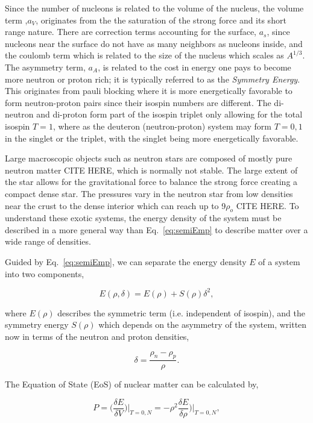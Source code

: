 Since the number of nucleons is related to the volume of the nucleus, the volume term ,$a_V$, originates from the the saturation of the strong force and its short range nature. There are correction terms accounting for the surface, $a_s$, since nucleons near the surface do not have as many neighbors as nucleons inside, and the coulomb term which is related to the size of the nucleus which scales as $A^{1/3}$. The asymmetry term, $a_A$, is related to the cost in energy one pays to become more neutron or proton rich; it is typically referred to as the \emph{Symmetry Energy}. This originates from pauli blocking where it is more energetically favorable to form neutron-proton pairs since their isospin numbers are different. The di-neutron and di-proton form part of the isospin triplet only allowing for the total isospin $T=1$, where as the deuteron (neutron-proton) system may form $T={0,1}$ in the singlet or the triplet, with the singlet being more energetically favorable. 

Large macroscopic objects such as neutron stars are composed of mostly pure neutron matter CITE HERE, which is normally not stable. The large extent of the star allows for the gravitational force to balance the strong force creating a compact dense star. The pressures vary in the neutron star from low densities near the crust to the dense interior which can reach up to 9$\rho_o$ CITE HERE. To understand these exotic systems, the energy density of the system must be described in a more general way than Eq.~\ref{eq:semiEmp} to describe matter over a wide range of densities. 

Guided by Eq.~\ref{eq:semiEmp}, we can separate the energy density $E$ of a system into two components,

\begin{equation}
E(\rho,\delta) = E(\rho	) + S(\rho)\delta^2,
\label{eq:energyEos}
\end{equation}

where $E(\rho)$ describes the symmetric term (i.e. independent of isospin), and the symmetry energy $S(\rho)$ which depends on the asymmetry of the system, written now in terms of the neutron and proton densities, 

\begin{equation}
\delta = \frac{\rho_n - \rho_p}{\rho}.
\label{eq:asym}
\end{equation}

The Equation of State (EoS) of nuclear matter can be calculated by, 

\begin{equation}
P = \Big(\frac{\delta E}{\delta V}\Big)\vert_{T=0,N} = -\rho^2 \frac{\delta E}{\delta \rho}\Big)\vert_{T=0,N}, 
\label{eq:pressEos}
\end{equation}

